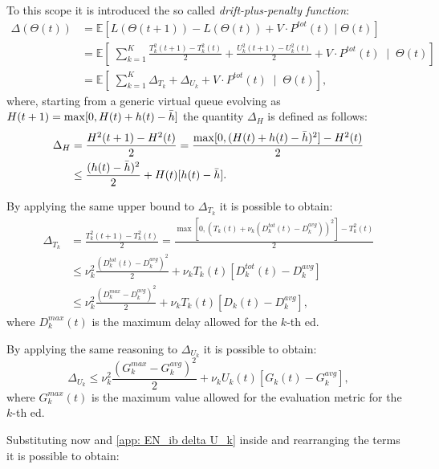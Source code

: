 To this scope it is introduced the so called \textit{drift-plus-penalty function}:
\begin{align}
    \Delta(\Theta(t)) &= \mathbb{E}\left[L({\Theta}(t+1))-L({\Theta}(t))+V\cdot P^{tot}(t)  \;\Big|\; \Theta(t)\right] \\
    &=\mathbb{E}\left[\;\sum_{k=1}^K \frac{T_k^2(t+1)-T_k^2(t)}{2} +  \frac{U_k^2(t+1)-U_k^2(t)}{2} +V\cdot P^{tot}(t)\;\; \Big|\;\; \Theta(t)\right]\\
    &= \mathbb{E}\left[\;\sum_{k=1}^K \Delta_{T_k} +  \Delta_{U_k} +V\cdot P^{tot}(t) \;\; \Big|\;\; \Theta(t)\right],
    \label{app: EN_ib drift plus penalty}
\end{align}
where, starting from a generic virtual queue evolving as 
$H(t+1) = \max [0,H(t) +h(t) - \Bar{h}]$ the quantity $\Delta_H$ is defined as follows:
\begin{align*}
    \Delta_H &= \frac{H^2(t+1)-H^2(t)}{2} = \frac{\max [0,(H(t) +h(t) - \Bar{h})^2]-H^2(t)}{2} \\
   &\leq   \frac{(h(t) - \Bar{h})^2}{2} + H(t)[h(t)-\Bar{h}].
\end{align*} 

By applying the same upper bound to $\Delta_{T_k}$ it is possible to obtain:
\begin{align}
    \Delta_{T_k} &= \frac{T_k^2(t+1)-T_k^2(t)}{2} = \frac{\max [0,(T_k(t) + \nu_k(D_k^{tot}(t) - D_k^{avg}))^2]-T_k^2(t)}{2} \\
    &\leq   \nu_k^2\frac{(D_k^{tot}(t) - D_k^{avg})^2}{2} + \nu_k T_k(t)[D_k^{tot}(t) - D_k^{avg}] \\
    &\leq \nu_k^2\frac{(D_k^{max} - D_k^{avg})^2}{2}  + \nu_k T_k(t)[D_k(t) - D_k^{avg}],
    \label{app: EN_ib delta U_k}
\end{align}
where $D_k^{max}(t)$ is the maximum delay allowed for the $k$-th \gls{ed}.

By applying the same reasoning to $\Delta_{U_k}$ it is possible to obtain:
\begin{equation}
    \Delta_{U_k} \leq \nu_k^2\frac{(G_k^{max} - G_k^{avg})^2}{2}  + \nu_k U_k(t)[G_k(t) - G_k^{avg}],
    \label{app: EN_ib delta U_k}
\end{equation}
where $G_k^{max}(t)$ is the maximum value allowed for the evaluation metric for the $k$-th \gls{ed}.

Substituting now  and \eqref{app: EN_ib delta U_k} inside  and rearranging the terms it is possible to obtain:

